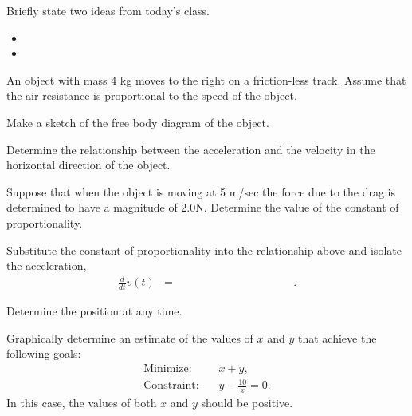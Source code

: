 \begin{problem}
\item Briefly state two ideas from today's class.
  \begin{itemize}
  \item
  \item
  \end{itemize}
\item An object with mass 4 kg moves to the right on a friction-less
  track. Assume that the air resistance is proportional to the speed
  of the object.

  \begin{subproblem}
  \item Make a sketch of the free body diagram of the object.
    \vfill

  \item Determine the relationship between the acceleration and the
    velocity in the horizontal direction of the object.

    \vfill

  \item Suppose that when the object is moving at 5 m/sec the force
    due to the drag is determined to have a magnitude of
    2.0N. Determine the value of the constant of proportionality.
    \vfill
  \item Substitute the constant of proportionality into the
    relationship above and isolate the acceleration,
    \begin{eqnarray*}
      \frac{d}{dt} v(t) & = & \hspace{10em}.
    \end{eqnarray*}
    \vfill
  \item Determine the position at any time.
    \vfill
  \end{subproblem}
\end{problem}




\begin{problem}
\item Graphically determine an estimate of the values of $x$ and $y$
  that achieve the following goals:
  \begin{eqnarray*}
    \mathrm{Minimize:}  & & x+y, \\
    \mathrm{Constraint:}  & & y - \frac{10}{x}  =  0.
  \end{eqnarray*}
  In this case, the values of both $x$ and $y$ should be positive.

  \vfill


\end{problem}


